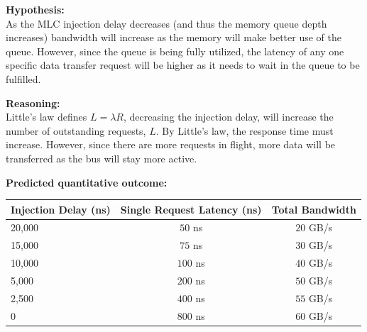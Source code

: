 \documentclass[11pt]{article}
\begin{document}
\begin{hypothesisbox}
	\textbf{Hypothesis:} \\

	As the MLC injection delay decreases (and thus the memory queue depth increases) bandwidth will increase as the memory
	will make better use of the queue. However, since the queue is being fully utilized, the latency of any one specific
	data transfer request will be higher as it needs to wait in the queue to be fulfilled.

	\textbf{Reasoning:} \\

	Little's law defines $L = \lambda R$, decreasing the injection delay, will increase the number of outstanding requests,
	$L$. By Little's law, the response time must increase. However, since there are more requests in flight, more data will
	be transferred as the bus will stay more active.

	\textbf{Predicted quantitative outcome:} \\
	\begin{center}
		\label{tab:hypothesis-huge-pages}
		\begin{tabular}{lcc}
			\toprule
			\textbf{Injection Delay (ns)} & \textbf{Single Request Latency (ns)} & \textbf{Total Bandwidth} \\
			\midrule
			20,000                        & $50$ ns                              & $20$ GB/s                \\
			15,000                        & $75$ ns                              & $30$ GB/s                \\
			10,000                        & $100$ ns                             & $40$ GB/s                \\
			5,000                         & $200$ ns                             & $50$ GB/s                \\
			2,500                         & $400$ ns                             & $55$ GB/s                \\
			0                             & $800$ ns                             & $60$ GB/s                \\
			\bottomrule
		\end{tabular}
	\end{center}
\end{hypothesisbox}
\end{document}
